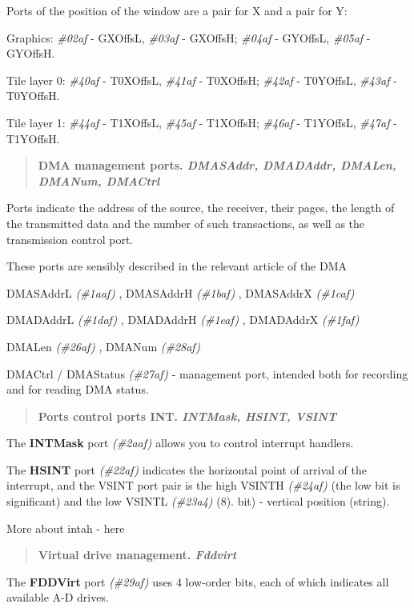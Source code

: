 \documentclass{article}
\begin{document}
Ports of the position of the window are a pair for X and a pair for Y:

Graphics: \emph{\#02af} - GXOffsL, \emph{\#03af} - GXOffsH;
\emph{\#04af} - GYOffsL, \emph{\#05af} - GYOffsH.

Tile layer 0: \emph{\#40af} - T0XOffsL, \emph{\#41af} - T0XOffsH;
\emph{\#42af} - T0YOffsL, \emph{\#43af} - T0YOffsH.

Tile layer 1: \emph{\#44af} - T1XOffsL, \emph{\#45af} - T1XOffsH;
\emph{\#46af} - T1YOffsL, \emph{\#47af} - T1YOffsH.

\begin{quotation}
  \textbf{DMA management ports. \emph{DMASAddr, DMADAddr, DMALen,
      DMANum, DMACtrl}}
\end{quotation}
Ports indicate the address of the source, the receiver, their pages,
the length of the transmitted data and the number of such
transactions, as well as the transmission control port.

These ports are sensibly described in the relevant article of the DMA

DMASAddrL \emph{(\#1aaf)} , DMASAddrH \emph{(\#1baf)} , DMASAddrX
\emph{(\#1caf)}

DMADAddrL \emph{(\#1daf)} , DMADAddrH \emph{(\#1eaf)} , DMADAddrX
\emph{(\#1faf)}

DMALen \emph{(\#26af)} , DMANum \emph{(\#28af)}

DMACtrl / DMAStatus \emph{(\#27af)} - management port, intended both
for recording and for reading DMA status.

\begin{quotation}
  \textbf{Ports control ports INT. \emph{INTMask, HSINT, VSINT}}
\end{quotation}
The \textbf{INTMask} port \emph{(\#2aaf)} allows you to control
interrupt handlers.

The \textbf{HSINT} port \emph{(\#22af)} indicates the horizontal point
of arrival of the interrupt, and the VSINT port pair is the high
VSINTH \emph{(\#24af)} (the low bit is significant) and the low VSINTL
\emph{(\#23a4)} (8). bit) - vertical position (string).

More about intah - here

\begin{quotation}
  \textbf{Virtual drive management. \emph{Fddvirt}}
\end{quotation}
The \textbf{FDDVirt} port \emph{(\#29af)} uses 4 low-order bits, each
of which indicates all available A-D drives.
\end{document}
